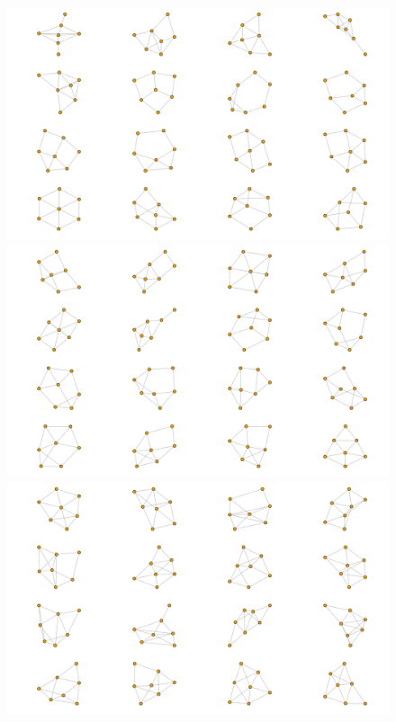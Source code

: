 \begin{figure}[h!]
	\subfloat
	{\includegraphics[width=0.95\linewidth]{atlas/atlas7-11.png}} \\
	\subfloat
    {\includegraphics[width=0.95\linewidth]{atlas/atlas7-12.png}} \\
    \subfloat
    {\includegraphics[width=0.95\linewidth]{atlas/atlas7-13.png}}
\end{figure}

